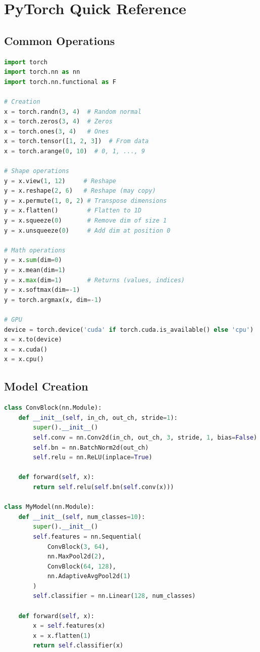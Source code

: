 \chapter{PyTorch Quick Reference}

\section{Common Operations}

\begin{lstlisting}[language=Python, caption={Common PyTorch tensor operations}]
import torch
import torch.nn as nn
import torch.nn.functional as F

# Creation
x = torch.randn(3, 4)  # Random normal
x = torch.zeros(3, 4)  # Zeros
x = torch.ones(3, 4)   # Ones
x = torch.tensor([1, 2, 3])  # From data
x = torch.arange(0, 10)  # 0, 1, ..., 9

# Shape operations
y = x.view(1, 12)     # Reshape
y = x.reshape(2, 6)   # Reshape (may copy)
y = x.permute(1, 0, 2) # Transpose dimensions
y = x.flatten()        # Flatten to 1D
y = x.squeeze(0)       # Remove dim of size 1
y = x.unsqueeze(0)     # Add dim at position 0

# Math operations
y = x.sum(dim=0)
y = x.mean(dim=1)
y = x.max(dim=1)       # Returns (values, indices)
y = x.softmax(dim=-1)
y = torch.argmax(x, dim=-1)

# GPU
device = torch.device('cuda' if torch.cuda.is_available() else 'cpu')
x = x.to(device)
x = x.cuda()
x = x.cpu()
\end{lstlisting}

\section{Model Creation}

\begin{lstlisting}[language=Python, caption={PyTorch model definition patterns}]
class ConvBlock(nn.Module):
    def __init__(self, in_ch, out_ch, stride=1):
        super().__init__()
        self.conv = nn.Conv2d(in_ch, out_ch, 3, stride, 1, bias=False)
        self.bn = nn.BatchNorm2d(out_ch)
        self.relu = nn.ReLU(inplace=True)

    def forward(self, x):
        return self.relu(self.bn(self.conv(x)))

class MyModel(nn.Module):
    def __init__(self, num_classes=10):
        super().__init__()
        self.features = nn.Sequential(
            ConvBlock(3, 64),
            nn.MaxPool2d(2),
            ConvBlock(64, 128),
            nn.AdaptiveAvgPool2d(1)
        )
        self.classifier = nn.Linear(128, num_classes)

    def forward(self, x):
        x = self.features(x)
        x = x.flatten(1)
        return self.classifier(x)
\end{lstlisting}

